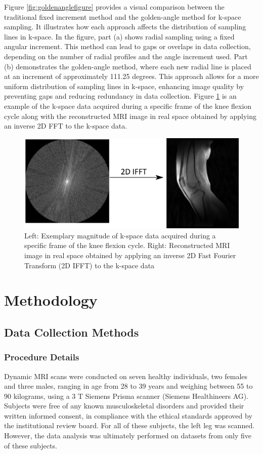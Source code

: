 \documentclass{micro-econ-thesis}
\begin{document}
 
Figure \ref{fig:goldenanglefigure} provides a visual comparison between the traditional fixed increment method and the golden-angle method for k-space sampling. It illustrates how each approach affects the distribution of sampling lines in k-space. In the figure, part (a) shows radial sampling using a fixed angular increment. This method can lead to gaps or overlaps in data collection, depending on the number of radial profiles and the angle increment used. Part (b) demonstrates the golden-angle method, where each new radial line is placed at an increment of approximately 111.25 degrees. This approach allows for a more uniform distribution of sampling lines in k-space, enhancing image quality by preventing gaps and reducing redundancy in data collection. Figure \ref{fig:kspacearrow} is an example of the k-space data acquired during a specific frame of the knee flexion cycle along with  the reconstructed MRI image in real space obtained by applying an inverse 2D FFT to the k-space data.
\begin{figure}[H]
	\centering
	\includegraphics[scale=0.3]{kspace_arrow_2}
	\caption{Left: Exemplary magnitude of k-space data acquired during a specific frame of the knee flexion cycle. Right: Reconstructed MRI image in real space obtained by applying an inverse 2D Fast Fourier Transform (2D IFFT) to the k-space data}
	\label{fig:kspacearrow}
\end{figure}
  


\section{Methodology}
\label{sec:methods}

\subsection{Data Collection Methods}

\subsubsection{Procedure Details}
Dynamic MRI scans were conducted on seven healthy individuals, two females and three males, ranging in age from 28 to 39 years and weighing between 55 to 90 kilograms, using a 3 T Siemens Prisma scanner (Siemens Healthineers AG). Subjects were free of any known musculoskeletal disorders and provided their written informed consent, in compliance with the ethical standards approved by the institutional review board. For all of these subjects, the left leg was scanned. However, the data analysis was ultimately performed on datasets from only five of these subjects.
\end{document}
